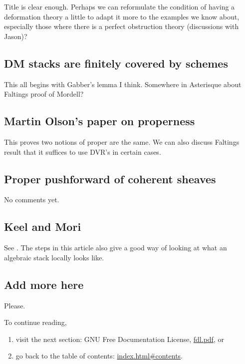 \documentclass{amsart}
\theoremstyle{definition}
\theoremstyle{remark}
\numberwithin{equation}{subsection}
\begin{document}
\noindent
Title is clear enough. Perhaps we can reformulate the condition of having a
deformation theory a little to adapt it more to the examples we know about,
especially those where there is a perfect obstruction theory (discussions 
with Jason)?

\subsection{DM stacks are finitely covered by schemes}
\label{subsection-dm-finite-cover}

\noindent
This all begins with Gabber's lemma I think. Somewhere in Asterisque about
Faltings proof of Mordell?

\subsection{Martin Olson's paper on properness}
\label{subsection-proper-parametrization}

\noindent
This proves two notions of proper are the same. We can also discuss Faltings
result that it suffices to use DVR's in certain cases.

\subsection{Proper pushforward of coherent sheaves}
\label{subsection-proper-pushforward}

\noindent
No comments yet.

\subsection{Keel and Mori} 
\label{subsection-keel-mori}

\noindent
See \cite{K-M}. The steps in this article also give a good way of looking at
what an algebraic stack locally looks like.

\subsection{Add more here} 
\label{subsection-add-more}

\noindent
Please.

\smallskip\noindent
To continue reading, 
\begin{enumerate}

\item visit the next section: GNU Free Documentation License,
\url{fdl.pdf}, or 

\item go back to the
table of contents: \url{index.html#contents}.

\end{enumerate}






\end{document}
